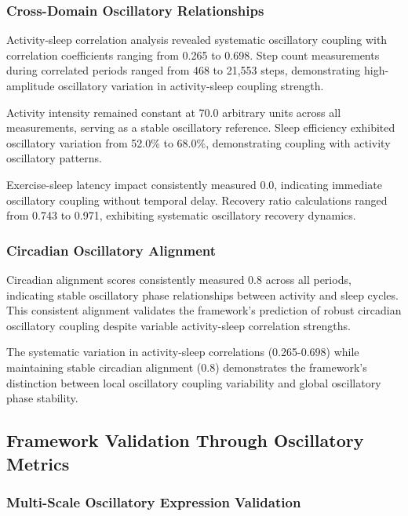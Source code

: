 \subsubsection{Cross-Domain Oscillatory Relationships}

Activity-sleep correlation analysis revealed systematic oscillatory coupling with correlation coefficients ranging from 0.265 to 0.698. Step count measurements during correlated periods ranged from 468 to 21,553 steps, demonstrating high-amplitude oscillatory variation in activity-sleep coupling strength.

Activity intensity remained constant at 70.0 arbitrary units across all measurements, serving as a stable oscillatory reference. Sleep efficiency exhibited oscillatory variation from 52.0\% to 68.0\%, demonstrating coupling with activity oscillatory patterns.

Exercise-sleep latency impact consistently measured 0.0, indicating immediate oscillatory coupling without temporal delay. Recovery ratio calculations ranged from 0.743 to 0.971, exhibiting systematic oscillatory recovery dynamics.

\subsubsection{Circadian Oscillatory Alignment}

Circadian alignment scores consistently measured 0.8 across all periods, indicating stable oscillatory phase relationships between activity and sleep cycles. This consistent alignment validates the framework's prediction of robust circadian oscillatory coupling despite variable activity-sleep correlation strengths.

The systematic variation in activity-sleep correlations (0.265-0.698) while maintaining stable circadian alignment (0.8) demonstrates the framework's distinction between local oscillatory coupling variability and global oscillatory phase stability.

\subsection{Framework Validation Through Oscillatory Metrics}

\subsubsection{Multi-Scale Oscillatory Expression Validation}

